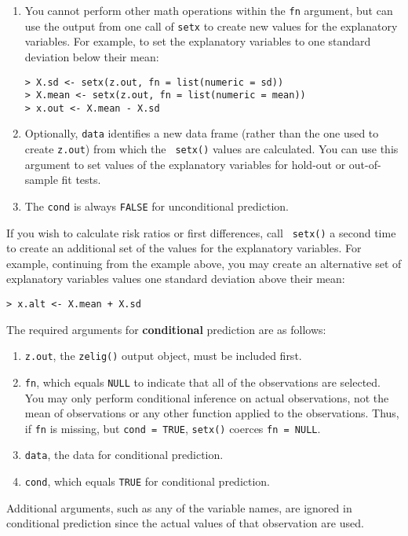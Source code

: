 \begin{enumerate}
\begin{enumerate}
 \item You cannot perform other math operations within the {\tt fn}
   argument, but can use the output from one call of {\tt setx} to
   create new values for the explanatory variables.  For example, to
   set the explanatory variables to one standard deviation below their
   mean:
\begin{verbatim}
> X.sd <- setx(z.out, fn = list(numeric = sd))     
> X.mean <- setx(z.out, fn = list(numeric = mean)) 
> x.out <- X.mean - X.sd           
\end{verbatim}
   
 \item Optionally, \texttt{data} identifies a new data frame (rather
   than the one used to create {\tt z.out}) from which the {\tt
     setx()} values are calculated.  You can use this argument to set
   values of the explanatory variables for hold-out or out-of-sample
   fit tests.
 \item The {\tt cond} is always {\tt FALSE} for unconditional
   prediction.
 \end{enumerate}
   
 If you wish to calculate risk ratios or first differences, call {\tt
   setx()} a second time to create an additional set of the values for
 the explanatory variables.  For example, continuing from the example
 above, you may create an alternative set of explanatory variables
 values one standard deviation above their mean:
\begin{verbatim}
> x.alt <- X.mean + X.sd
\end{verbatim}
 
 The required arguments for \textbf{conditional} prediction are as
 follows:
 \begin{enumerate}
 \item {\tt z.out}, the {\tt zelig()} output object, must be included
   first.
   
 \item {\tt fn}, which equals {\tt NULL} to indicate that all of the
   observations are selected.  You may only perform conditional
   inference on actual observations, not the mean of observations or
   any other function applied to the observations.  Thus, if {\tt fn}
   is missing, but {\tt cond = TRUE}, {\tt setx()} coerces {\tt fn =
     NULL}.

 \item {\tt data}, the data for conditional prediction.  
   
 \item {\tt cond}, which equals {\tt TRUE} for conditional prediction.
 \end{enumerate}
 Additional arguments, such as any of the variable names, are ignored
 in conditional prediction since the actual values of that observation
 are used.
 

\end{enumerate}
